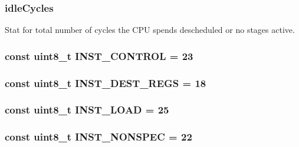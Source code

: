 \label{classInOrderCPU_a6a5c774a90c1d03f1cfc418f4c9876e2}
\hypertarget{classInOrderCPU_a42e0f4c18fdb8ef7504f5c45d697fb14}{
\subsubsection[{idleCycles}]{ {\bf idleCycles}}}
\label{classInOrderCPU_a42e0f4c18fdb8ef7504f5c45d697fb14}
Stat for total number of cycles the CPU spends descheduled or no stages active. \hypertarget{classInOrderCPU_a202c5d802fb841a0c3faf2f36737ecd8}{
\subsubsection[{INST\_\-CONTROL}]{\setlength{\rightskip}{0pt plus 5cm}const uint8\_\-t {\bf INST\_\-CONTROL} = 23}}
\label{classInOrderCPU_a202c5d802fb841a0c3faf2f36737ecd8}
\hypertarget{classInOrderCPU_a89c9d4d44bcca23c206e33116684b91e}{
\subsubsection[{INST\_\-DEST\_\-REGS}]{\setlength{\rightskip}{0pt plus 5cm}const uint8\_\-t {\bf INST\_\-DEST\_\-REGS} = 18}}
\label{classInOrderCPU_a89c9d4d44bcca23c206e33116684b91e}
\hypertarget{classInOrderCPU_a5b3806af6c911af84cd16d860f4436b2}{
\subsubsection[{INST\_\-LOAD}]{\setlength{\rightskip}{0pt plus 5cm}const uint8\_\-t {\bf INST\_\-LOAD} = 25}}
\label{classInOrderCPU_a5b3806af6c911af84cd16d860f4436b2}
\hypertarget{classInOrderCPU_a079fa8746c9fa2240354d5e9c476bb24}{
\subsubsection[{INST\_\-NONSPEC}]{\setlength{\rightskip}{0pt plus 5cm}const uint8\_\-t {\bf INST\_\-NONSPEC} = 22}}
